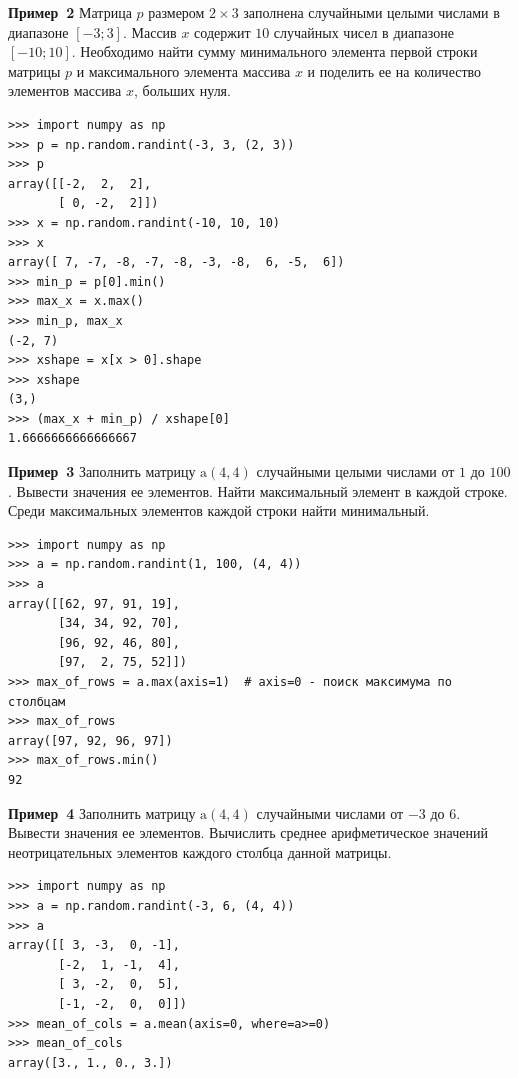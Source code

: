 \documentclass[aspectratio=169, mathserif]{beamer}%
\begin{document}
\begin{frame}[fragile]{\textcolor{tpugreen}{\textbf{Пример~2}}}
\scriptsize
Матрица $p$ размером $2 \times 3$ заполнена случайными целыми числами в диапазоне $\left[-3; 3\right]$. Массив $x$ содержит $10$ случайных чисел в диапазоне $\left[-10; 10\right]$. Необходимо найти сумму минимального элемента первой строки матрицы $p$ и максимального элемента массива $x$ и поделить ее на количество элементов массива $x$, больших нуля.
\vfill
\begin{verbatim}
>>> import numpy as np
>>> p = np.random.randint(-3, 3, (2, 3))
>>> p
array([[-2,  2,  2],
       [ 0, -2,  2]])
>>> x = np.random.randint(-10, 10, 10)
>>> x
array([ 7, -7, -8, -7, -8, -3, -8,  6, -5,  6])
>>> min_p = p[0].min()
>>> max_x = x.max()
>>> min_p, max_x
(-2, 7)
>>> xshape = x[x > 0].shape
>>> xshape
(3,)
>>> (max_x + min_p) / xshape[0]
1.6666666666666667
\end{verbatim}
\vfill
\end{frame}

\begin{frame}[fragile]{\textcolor{tpugreen}{\textbf{Пример~3}}}
\scriptsize
Заполнить матрицу $\mathrm{a}(4, 4)$ случайными целыми числами от $1$ до $100$. Вывести значения ее элементов. Найти максимальный элемент в каждой строке. Среди максимальных элементов каждой строки найти минимальный.
\vfill
\begin{verbatim}
>>> import numpy as np
>>> a = np.random.randint(1, 100, (4, 4))
>>> a
array([[62, 97, 91, 19],
       [34, 34, 92, 70],
       [96, 92, 46, 80],
       [97,  2, 75, 52]])
>>> max_of_rows = a.max(axis=1)  # axis=0 - поиск максимума по столбцам
>>> max_of_rows
array([97, 92, 96, 97])
>>> max_of_rows.min()
92
\end{verbatim}
\vfill
\end{frame}

\begin{frame}[fragile]{\textcolor{tpugreen}{\textbf{Пример~4}}}
\scriptsize
Заполнить матрицу $\mathrm{a}(4, 4)$ случайными числами от $-3$ до $6$. Вывести значения ее элементов. Вычислить среднее арифметическое значений неотрицательных элементов каждого столбца данной матрицы.
\vfill
\begin{verbatim}
>>> import numpy as np
>>> a = np.random.randint(-3, 6, (4, 4))
>>> a
array([[ 3, -3,  0, -1],
       [-2,  1, -1,  4],
       [ 3, -2,  0,  5],
       [-1, -2,  0,  0]])
>>> mean_of_cols = a.mean(axis=0, where=a>=0)
>>> mean_of_cols
array([3., 1., 0., 3.])
\end{verbatim}
\vfill
\end{frame}
\end{document}

